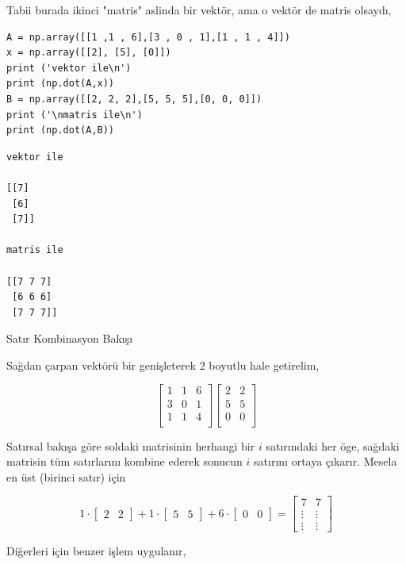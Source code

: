 \documentclass[12pt,fleqn]{article}\usepackage{../../common}
\begin{document}
Tabii burada ikinci "matris" aslinda bir vektör, ama o vektör de matris
olsaydı,

\begin{verbatim}
A = np.array([[1 ,1 , 6],[3 , 0 , 1],[1 , 1 , 4]])
x = np.array([[2], [5], [0]])
print ('vektor ile\n')
print (np.dot(A,x))
B = np.array([[2, 2, 2],[5, 5, 5],[0, 0, 0]])
print ('\nmatris ile\n')
print (np.dot(A,B))
\end{verbatim}

\begin{verbatim}
vektor ile

[[7]
 [6]
 [7]]

matris ile

[[7 7 7]
 [6 6 6]
 [7 7 7]]
\end{verbatim}

Satır Kombinasyon Bakışı

Sağdan çarpan vektörü bir genişleterek 2 boyutlu hale getirelim, 

$$
\left[\begin{array}{ccc}
1 & 1 & 6 \\
3 & 0 & 1 \\
1 & 1 & 4 \\
\end{array}\right]
\left[\begin{array}{ccc}
2 & 2  \\
5 & 5  \\
0 & 0  \\
\end{array}\right]
$$

Satırsal bakışa göre soldaki matrisinin herhangi bir $i$ satırındaki her
öge, sağdaki matrisin tüm satırlarını kombine ederek sonucun $i$ satırını
ortaya çıkarır. Mesela en üst (birinci satır) için

$$ 
1 \cdot
\left[\begin{array}{cc}
2 & 2
\end{array}\right] +
1 \cdot
\left[\begin{array}{cc}
5 & 5
\end{array}\right] + 
6 \cdot
\left[\begin{array}{cc}
0 & 0
\end{array}\right] 
=
\left[\begin{array}{cc}
7 & 7 \\
\vdots & \vdots \\
\vdots & \vdots
\end{array}\right] 
$$

Diğerleri için benzer işlem uygulanır, 
\end{document}
